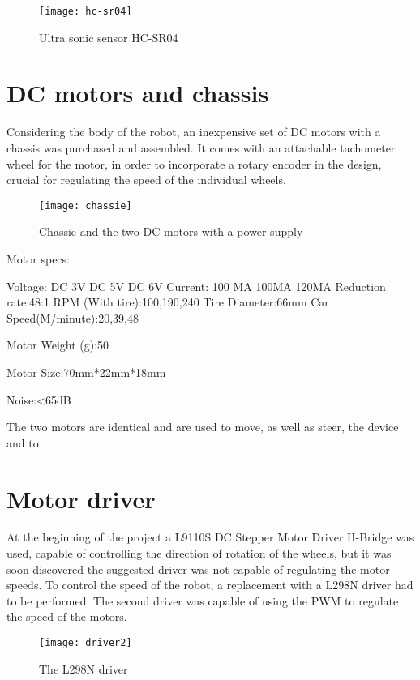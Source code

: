 \begin{figure}[h]
\centering
\texttt{[image: hc-sr04]}
\caption{Ultra sonic sensor HC-SR04}
\label{fig::hcsr04}
\end{figure}

\section{DC motors and chassis} 

Considering the body of the robot, an inexpensive set of DC motors with a chassis was purchased and assembled. It comes with an attachable tachometer wheel for the motor, in order to incorporate a rotary encoder in the design, crucial for regulating the speed of the individual wheels.

\begin{figure}[h]
\centering
\texttt{[image: chassie]}
\caption{Chassie and the two DC motors with a power supply}
\label{fig::chassie}
\end{figure}

Motor specs:

Voltage:
DC 3V
DC 5V
DC 6V
Current:
100 MA
100MA
120MA
Reduction rate:48:1
RPM (With tire):100,190,240
Tire Diameter:66mm
Car Speed(M/minute):20,39,48

Motor Weight (g):50

Motor Size:70mm*22mm*18mm

Noise:<65dB 

The two motors are identical and are used to move, as well as steer, the device and to 

\section{Motor driver} 

At the beginning of the project a L9110S DC Stepper Motor Driver H-Bridge was used, capable of controlling the direction of rotation of the wheels, but it was soon discovered the suggested driver was not capable of regulating the motor speeds.
To control the speed of the robot, a replacement with a L298N driver had to be performed.
The second driver was capable of using the PWM to regulate the speed of the motors.

\begin{figure}[h]
\centering
\texttt{[image: driver2]}
\caption{The L298N driver}
\label{fig::driver2}
\end{figure}


